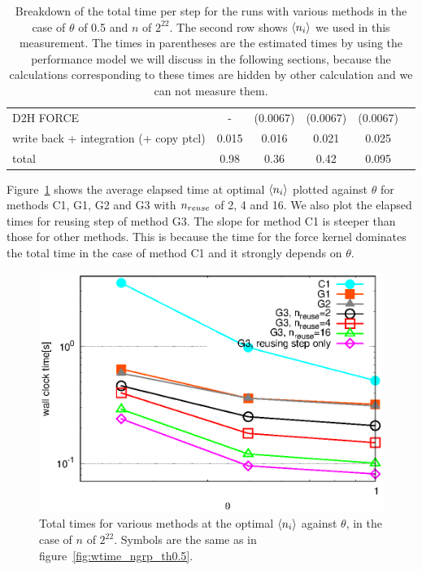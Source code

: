 \documentclass[dvipdfmx]{pasj01}
\begin{document}
\begin{table}
\begin{tabular}{lccccc}
    \hspace{8dd} D2H FORCE                            & -       & (0.0067) & (0.0067) & (0.0067)  \\
    \hspace{8dd} write back + integration (+ copy ptcl)& 0.015   & 0.016    & 0.021    & 0.025  \\
    \midrule
    total                                             & 0.98    & 0.36     & 0.42     & 0.095 \\
    \midrule
  \bottomrule
  \end{tabular}
  \caption{Breakdown of the total time per step for the runs with
    various methods in the case of $\theta$ of 0.5 and $n$ of
    $2^{22}$. The second row shows $\langle n_{\rm i} \rangle$ we used
    in this measurement. The times in parentheses are the estimated
    times by using the performance model we will discuss in the
    following sections, because the calculations corresponding to
    these times are hidden by other calculation and we can not measure
    them.}
  \label{tab:time}
\end{table}

Figure~\ref{fig:theta_wtime} shows the average elapsed time at optimal
$\langle n_{\rm i} \rangle$ plotted against $\theta$ for methods C1,
G1, G2 and G3 with $n_{\rm reuse}$ of 2, 4 and 16. We also plot the
elapsed times for reusing step of method G3. The slope for method C1
is steeper than those for other methods. This is because the time for
the force kernel dominates the total time in the case of method C1 and
it strongly depends on $\theta$.

\begin{figure}
    \begin{center}
      \includegraphics[width=12cm]{./fig/theta_wtime.eps}
    \end{center}
    \caption{Total times for various methods at the optimal $\langle
      n_{\rm i} \rangle$ against $\theta$, in the case of $n$ of
      $2^{22}$. Symbols are the same as in
      figure~\ref{fig:wtime_ngrp_th0.5}.}
  \label{fig:theta_wtime}
\end{figure}
\end{document}
